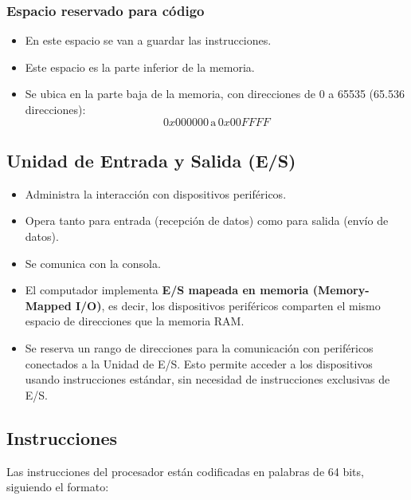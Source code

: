 \documentclass{article}
\begin{document}
\subsubsection{Espacio reservado para código}

\begin{itemize}
    \item En este espacio se van a guardar las instrucciones.
    \item Este espacio es la parte inferior de la memoria.
    \item Se ubica en la parte baja de la memoria, con direcciones de 0 a 65535 (65.536 direcciones):
    \[
    0x000000 \, \text{a} \, 0x00FFFF
    \]
\end{itemize}


\subsection{Unidad de Entrada y Salida (E/S)}

\begin{itemize}
    \item Administra la interacción con dispositivos periféricos.
    \item Opera tanto para entrada (recepción de datos) como para salida (envío de datos).
    \item Se comunica con la consola.
    \item El computador implementa \textbf{E/S mapeada en memoria (Memory-Mapped I/O)}, es decir, los dispositivos periféricos comparten el mismo espacio de direcciones que la memoria RAM.
    \item Se reserva un rango de direcciones para la comunicación con periféricos conectados a la Unidad de E/S. Esto permite acceder a los dispositivos usando instrucciones estándar, sin necesidad de instrucciones exclusivas de E/S.
\end{itemize}


\subsection{Instrucciones}

Las instrucciones del procesador están codificadas en palabras de 64 bits, siguiendo el formato:
\end{document}
